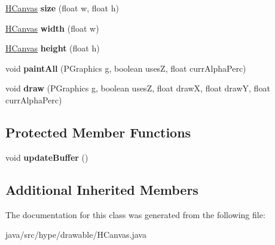 \begin{DoxyCompactItemize}
\item 
\hypertarget{classhype_1_1drawable_1_1_h_canvas_aa23f93ad22eb3aea5810fc337411d310}{\hyperlink{classhype_1_1drawable_1_1_h_canvas}{H\-Canvas} {\bfseries size} (float w, float h)}\label{classhype_1_1drawable_1_1_h_canvas_aa23f93ad22eb3aea5810fc337411d310}

\item 
\hypertarget{classhype_1_1drawable_1_1_h_canvas_a3d44daed96f1b010848c73ee31f3a103}{\hyperlink{classhype_1_1drawable_1_1_h_canvas}{H\-Canvas} {\bfseries width} (float w)}\label{classhype_1_1drawable_1_1_h_canvas_a3d44daed96f1b010848c73ee31f3a103}

\item 
\hypertarget{classhype_1_1drawable_1_1_h_canvas_a5782a46d0b847bdd03f13034bddbcfbc}{\hyperlink{classhype_1_1drawable_1_1_h_canvas}{H\-Canvas} {\bfseries height} (float h)}\label{classhype_1_1drawable_1_1_h_canvas_a5782a46d0b847bdd03f13034bddbcfbc}

\item 
\hypertarget{classhype_1_1drawable_1_1_h_canvas_ab9c4170736dfd90149b29acd671ffd76}{void {\bfseries paint\-All} (P\-Graphics g, boolean uses\-Z, float curr\-Alpha\-Perc)}\label{classhype_1_1drawable_1_1_h_canvas_ab9c4170736dfd90149b29acd671ffd76}

\item 
\hypertarget{classhype_1_1drawable_1_1_h_canvas_a1a0c59344a132623f8c6e999b2cf232a}{void {\bfseries draw} (P\-Graphics g, boolean uses\-Z, float draw\-X, float draw\-Y, float curr\-Alpha\-Perc)}\label{classhype_1_1drawable_1_1_h_canvas_a1a0c59344a132623f8c6e999b2cf232a}

\end{DoxyCompactItemize}
\subsection*{Protected Member Functions}
\begin{DoxyCompactItemize}
\item 
\hypertarget{classhype_1_1drawable_1_1_h_canvas_af03fa8512ff9955433a25e265929f6ae}{void {\bfseries update\-Buffer} ()}\label{classhype_1_1drawable_1_1_h_canvas_af03fa8512ff9955433a25e265929f6ae}

\end{DoxyCompactItemize}
\subsection*{Additional Inherited Members}


The documentation for this class was generated from the following file\-:\begin{DoxyCompactItemize}
\item 
java/src/hype/drawable/H\-Canvas.\-java\end{DoxyCompactItemize}
